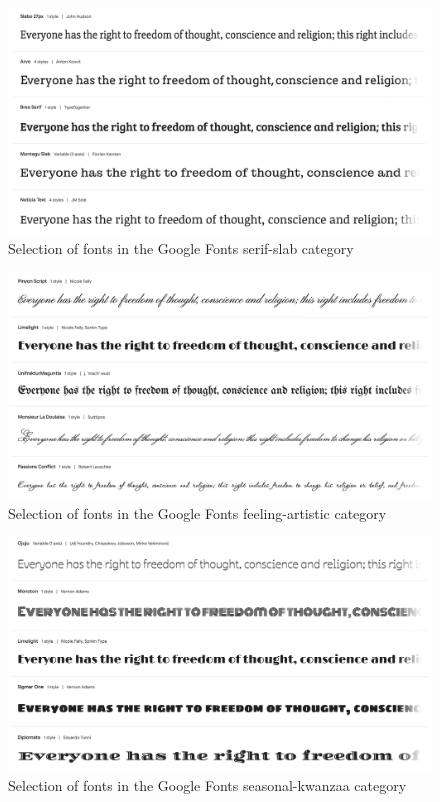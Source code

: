 \begin{figure}[p]
    \centering
    \includegraphics[width=\textwidth]{images/serif-slab.png}
    \caption{Selection of fonts in the Google Fonts serif-slab category}
    \label{fig:serif-slab}
\end{figure}

\begin{figure}[p]
    \centering
    \includegraphics[width=\textwidth]{images/feeling-artistic.png}
    \caption{Selection of fonts in the Google Fonts feeling-artistic category}
    \label{fig:feeling-artistic}
\end{figure}

\begin{figure}[p]
    \centering
    \includegraphics[width=\textwidth]{images/seasonal-kwanzaa.png}
    \caption{Selection of fonts in the Google Fonts seasonal-kwanzaa category}
    \label{fig:seasonal-kwanzaa}
\end{figure}


